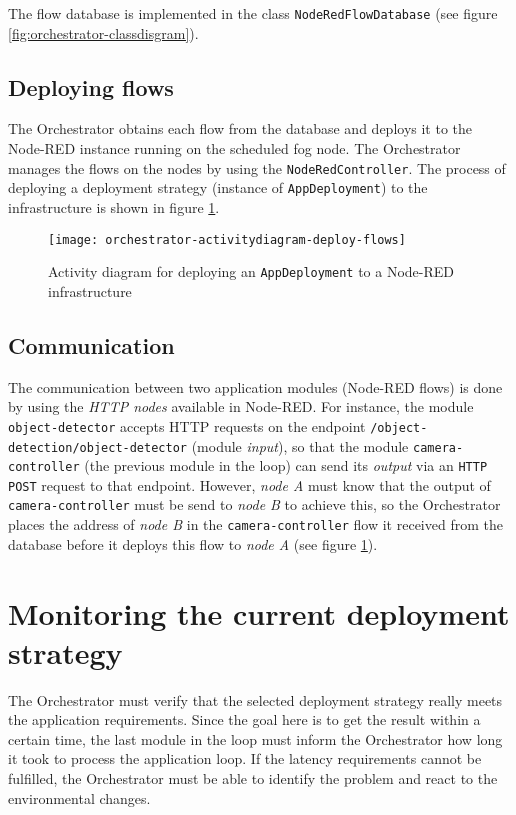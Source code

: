 The flow database is implemented in the class \texttt{NodeRedFlowDatabase} (see figure \ref{fig:orchestrator-classdisgram}).

\subsection*{Deploying flows}
The Orchestrator obtains each flow from the database and deploys it to the Node-RED instance running on the scheduled fog node.
The Orchestrator manages the flows on the nodes by using the \texttt{NodeRedController}.
The process of deploying a deployment strategy (instance of \texttt{AppDeployment}) to the infrastructure is shown in figure \ref{fig:orchestrator-activitydiagram-deploy-flows}.

\begin{figure}[htb]
    \centering
    \texttt{[image: orchestrator-activitydiagram-deploy-flows]}
    \caption{Activity diagram for deploying an \texttt{AppDeployment} to a Node-RED infrastructure}
    \label{fig:orchestrator-activitydiagram-deploy-flows}
\end{figure}

\subsection*{Communication}
The communication between two application modules (Node-RED flows) is done by using the \textit{HTTP nodes} available in Node-RED.
For instance, the module \texttt{object-detector} accepts HTTP requests on the endpoint \texttt{/object-detection/object-detector} (module \textit{input}), so that the module \texttt{camera-controller} (the previous module in the loop) can send its \textit{output} via an \texttt{HTTP POST} request to that endpoint.
However, \textit{node A} must know that the output of \texttt{camera-controller} must be send to \textit{node B} to achieve this, so the Orchestrator places the address of \textit{node B} in the \texttt{camera-controller} flow it received from the database before it deploys this flow to \textit{node A} (see figure \ref{fig:orchestrator-activitydiagram-deploy-flows}).

\section{Monitoring the current deployment strategy\label{sec:orchestrator-monitoring-deployment-strategy}}

The Orchestrator must verify that the selected deployment strategy really meets the application requirements.
Since the goal here is to get the result within a certain time, the last module in the loop must inform the Orchestrator how long it took to process the application loop.
If the latency requirements cannot be fulfilled, the Orchestrator must be able to identify the problem and react to the environmental changes.

